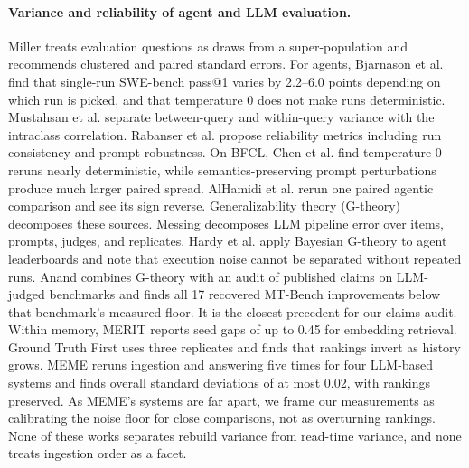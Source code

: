 \paragraph{Variance and reliability of agent and LLM evaluation.}
Miller \citep{miller2024errorbars} treats evaluation questions as draws from a super-population and recommends clustered and paired standard errors. For agents, Bjarnason et al. \citep{bjarnason2026randomness} find that single-run SWE-bench pass@1 varies by 2.2--6.0 points depending on which run is picked, and that temperature 0 does not make runs deterministic. Mustahsan et al. \citep{mustahsan2025stochasticity} separate between-query and within-query variance with the intraclass correlation. Rabanser et al. \citep{rabanser2026reliability} propose reliability metrics including run consistency and prompt robustness. On BFCL, Chen et al. \citep{chen2026noisefloor} find temperature-0 reruns nearly deterministic, while semantics-preserving prompt perturbations produce much larger paired spread. AlHamidi et al. \citep{alhamidi2026videoqa} rerun one paired agentic comparison and see its sign reverse. Generalizability theory (G-theory) decomposes these sources. Messing \citep{messing2026hidden} decomposes LLM pipeline error over items, prompts, judges, and replicates. Hardy et al. \citep{hardy2026agentreliability} apply Bayesian G-theory to agent leaderboards and note that execution noise cannot be separated without repeated runs. Anand \citep{anand2026askwhich} combines G-theory with an audit of published claims on LLM-judged benchmarks and finds all 17 recovered MT-Bench improvements below that benchmark's measured floor. It is the closest precedent for our claims audit. Within memory, MERIT \citep{mishra2026merit} reports seed gaps of up to 0.45 for embedding retrieval. Ground Truth First \citep{spencer2026groundtruth} uses three replicates and finds that rankings invert as history grows. MEME \citep{jung2026meme} reruns ingestion and answering five times for four LLM-based systems and finds overall standard deviations of at most 0.02, with rankings preserved. As MEME's systems are far apart, we frame our measurements as calibrating the noise floor for close comparisons, not as overturning rankings. None of these works separates rebuild variance from read-time variance, and none treats ingestion order as a facet.

